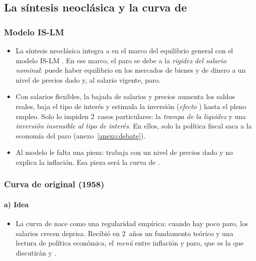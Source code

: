 \documentclass[11pt]{article}
\begin{document}
\subsection{La síntesis neoclásica y la curva de }\label{sec:sintesis}

\subsubsection{Modelo IS-LM}\label{sec:islm}

\begin{itemize}
\item La síntesis neoclásica integra a  en el marco del equilibrio general con el modelo IS-LM . En ese marco, el paro se debe a la \emph{rigidez del salario nominal}: puede haber equilibrio en los mercados de bienes y de dinero a un nivel de precios dado y, al salario vigente, paro.
\item Con salarios flexibles, la bajada de salarios y precios aumenta los saldos reales, baja el tipo de interés y estimula la inversión (\emph{efecto }) hasta el pleno empleo. Solo lo impiden 2~casos particulares: la \emph{trampa de la liquidez} y una \emph{inversión insensible al tipo de interés}. En ellos, solo la política fiscal saca a la economía del paro (anexo~\ref{anexo:debate}).
\item Al modelo le falta una pieza: trabaja con un nivel de precios dado y no explica la inflación. Esa pieza será la curva de .
\end{itemize}

\subsubsection{Curva de  original (1958)}\label{sec:phillips-original}

\paragraph{a) Idea}

\begin{itemize}
\item La curva de  nace como una regularidad empírica: cuando hay poco paro, los salarios crecen deprisa. Recibió en 2~años un fundamento teórico y una lectura de política económica, el \emph{menú} entre inflación y paro, que es la que discutirán  y .
\end{itemize}
\end{document}
